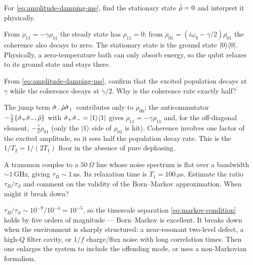 \begin{exercise}
For \cref{eq:amplitude-damping-me}, find the stationary state
$\dot{\hat{\rho}}=0$ and interpret it physically.
\begin{solution}
From $\dot\rho_{11}=-\gamma\rho_{11}$ the steady state has
$\rho_{11}=0$; from $\dot\rho_{01}=(i\omega_q-\gamma/2)\rho_{01}$ the
coherence also decays to zero. The stationary state is the ground
state $\ket0\!\bra0$. Physically, a zero-temperature bath can only
absorb energy, so the qubit relaxes to its ground state and stays
there.
\end{solution}
\end{exercise}

\begin{exercise}
From \cref{eq:amplitude-damping-me}, confirm that the excited
population decays at $\gamma$ while the coherence decays at
$\gamma/2$. Why is the coherence rate exactly half?
\begin{solution}
The jump term $\hat\sigma_-\hat{\rho}\hat\sigma_+$ contributes only to
$\rho_{00}$; the anticommutator
$-\tfrac\gamma2\acomm{\hat\sigma_+\hat\sigma_-}{\op\rho}$ with
$\hat\sigma_+\hat\sigma_-=\ket1\!\bra1$ gives
$\dot\rho_{11}=-\gamma\rho_{11}$ and, for the off-diagonal element,
$-\tfrac\gamma2\rho_{01}$ (only the $\ket1$ side of $\rho_{01}$ is
hit). Coherence involves one factor of the excited amplitude, so it
sees half the population decay rate. This is the $1/T_2=1/(2T_1)$
floor in the absence of pure dephasing.
\end{solution}
\end{exercise}

\begin{exercise}
A transmon couples to a $50\,\Omega$ line whose noise spectrum is
flat over a bandwidth $\sim 1\,$GHz, giving $\tau_B\sim 1\,$ns.
Its relaxation time is $T_1=100\,\mu$s. Estimate the ratio
$\tau_B/\tau_S$ and comment on the validity of the Born--Markov
approximation. When might it break down?
\begin{solution}
$\tau_B/\tau_S\sim 10^{-9}/10^{-4}=10^{-5}$, so the timescale
separation \cref{eq:markov-condition} holds by five orders of
magnitude --- Born--Markov is excellent. It breaks down when the
environment is sharply structured: a near-resonant two-level
defect, a high-$Q$ filter cavity, or $1/f$ charge/flux noise with
long correlation times. Then one enlarges the system to include the
offending mode, or uses a non-Markovian formalism.
\end{solution}
\end{exercise}

